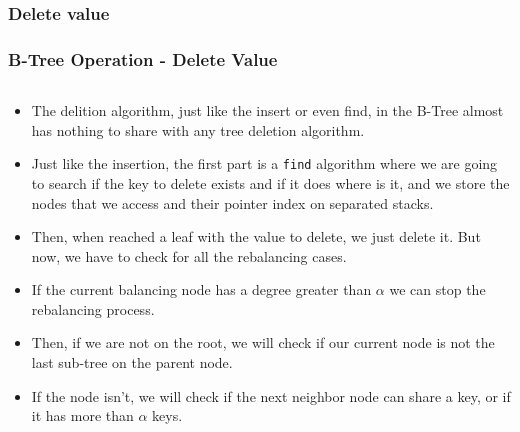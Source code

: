 \documentclass{beamer}
\begin{document}
\begin{frame}
    \subsubsection{Delete value}
    \frametitle{B-Tree Operation - Delete Value}
    \begin{columns}
        \begin{column}{\textlecolumn}
            \begin{block}{}
                \begin{itemize}
                    \item The delition algorithm, just like the insert or even find, in the B-Tree almost has nothing to share with any tree deletion algorithm.
                    \item Just like the insertion, the first part is a \lstinline|find| algorithm where we are going to search if the key to delete exists and if it does
                        where is it, and we store the nodes that we access and their pointer index on separated stacks.
                    \item Then, when reached a leaf with the value to delete, we just delete it. But now, we have to check 
                        for all the rebalancing cases.
                    \item If the current balancing node has a degree greater than \(\alpha\) we can stop the rebalancing process.
                    \item Then, if we are not on the root, we will check if our current node is not the last sub-tree on the parent node.
                    \item If the node isn't, we will check if the next neighbor node can share a key, or if it has more than \(\alpha\) keys.

\end{itemize}
\end{block}
\end{column}
\end{columns}
\end{frame}
\end{document}
